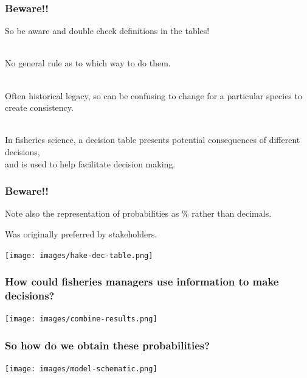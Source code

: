 
\begin{frame}
\frametitle{Beware!!}

So be aware and double check definitions in the tables!

~\\

No general rule as to which way to do them.

~\\

Often historical legacy, so can be confusing to change for a particular species
to create consistency.

~\\

In fisheries science, a decision table presents \alert{potential consequences of different decisions},\\
and is used to help facilitate decision making.

\end{frame}


\begin{frame}
\frametitle{Beware!!}

Note also the representation of probabilities as \% rather than decimals.

Was originally preferred by stakeholders.

\centering
\texttt{[image: images/hake-dec-table.png]}


\end{frame}


\begin{frame}
\frametitle{How could fisheries managers use information to make decisions?}

\centering
\texttt{[image: images/combine-results.png]}

\end{frame}


\begin{frame}
\frametitle{So how do we obtain these probabilities?}

\centering
\texttt{[image: images/model-schematic.png]}

\end{frame}

